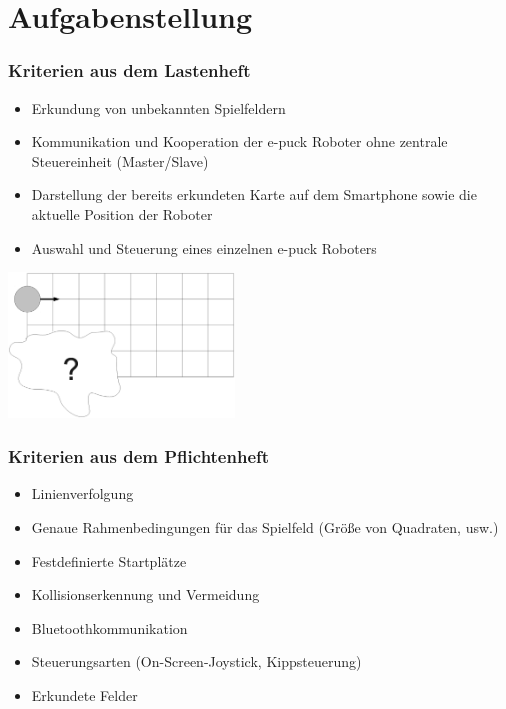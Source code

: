 \documentclass{beamer}
\begin{document}
\section{Aufgabenstellung}

\begin{frame}
  \frametitle{Kriterien aus dem Lastenheft}
  
	\begin{itemize}
		\item Erkundung von unbekannten Spielfeldern
		\item Kommunikation und Kooperation der e-puck Roboter ohne zentrale Steuereinheit 				(Master/Slave)
		\item Darstellung der bereits erkundeten Karte auf dem Smartphone sowie die 					aktuelle Position der Roboter
		\item Auswahl und Steuerung eines einzelnen e-puck Roboters
	\end{itemize}
	\vspace{15pt}
	\begin{center}
		\includegraphics[width=6cm]{unerkundet.eps}  
	\end{center}
	
\end{frame}

\begin{frame}
  \frametitle{Kriterien aus dem Pflichtenheft}
  
  	\begin{itemize}
  		\item Linienverfolgung
		\item Genaue Rahmenbedingungen für das Spielfeld (Größe von Quadraten, usw.)
		\item Festdefinierte Startplätze
		\item Kollisionserkennung und Vermeidung
		\item Bluetoothkommunikation
		\item Steuerungsarten (On-Screen-Joystick, Kippsteuerung)
		\item Erkundete Felder
	\end{itemize}  
\end{frame}
\end{document}
